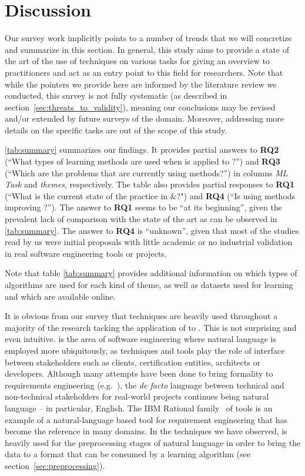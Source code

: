 \section{Discussion}
\label{sec:discussion}

Our survey work implicitly points to a number of trends that we will concretize
and summarize in this section. In general, this study aims to provide a state of
the art of the use of \ML techniques on various \RE tasks for giving an
overview to practitioners and act as an entry point to this field for
researchers. Note that while the pointers we provide here are informed by the
literature review we conducted, this survey is not fully systematic (as
described in section~\ref{sec:threats_to_validity}), meaning our conclusions may
be revised and/or extended by future surveys of the domain. Moreover, addressing
more details on the specific tasks are out of the scope of this study.

\Tab \ref{tab:summary} summarizes our findings. It provides partial answers to
\textbf{RQ2} (``What types of learning methods are used when \ML is applied to
\RE?'') and \textbf{RQ3} (``Which are the \RE problems that are currently using
\ML methods?'') in columns \emph{ML Task} and  \emph{themes}, respectively.
The table also provides partial responses to \textbf{RQ1} (``What is the current
state of the practice in \ML${\&}$\RE?") and \textbf{RQ4} (``Is using \ML
methods improving \RE?''). The answer to \textbf{RQ1} seems to be ``at its
beginning'', given the prevalent lack of comparison with the state of the art
as can be observed in \tab \ref{tab:summary}. The answer to \textbf{RQ4} is
``unknown'', given that most of the studies read by us were initial proposals
with little academic or no industrial validation in real software engineering
tools or projects.

Note that table \ref{tab:summary} provides additional information on which types of
algorithms are used for each kind of theme, as well as datasets used for
learning and which are available online.

It is obvious from our survey that \NLP techniques are heavily used
throughout a majority of the research tacking the application of \ML to
\RE. This is not surprising and even intuitive. \RE is the area of software
engineering where natural language is employed more ubiquitously, as \RE
techniques and tools play the role of interface between stakeholders such as
clients, certification entities, architects or developers. Although many
attempts have been done to bring formality to requirements
engineering (e.g.~\cite{Teufl17,LucioRCA16}), the \emph{de facto} language
between technical and non-technical stakeholders for real-world projects continues being
natural language -- in particular, English.
The IBM Rational \DOORS family~\cite{doors} of tools is an example
of a natural-language based tool for requirement engineering that has become the
reference in many domains. In the techniques we have observed, \NLP is heavily
used for the preprocessing stages of natural language in order to bring the data to a format
that can be consumed by a learning algorithm (see
section~\ref{sec:preprocessing}).
 
